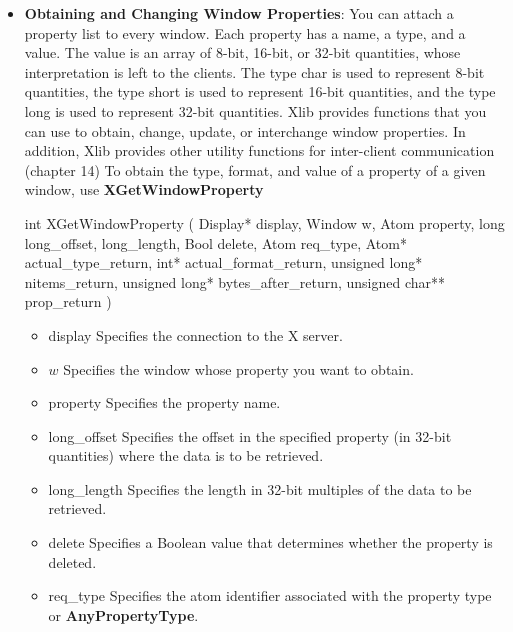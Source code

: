\documentclass{report}
\begin{document}
\begin{itemize}
        \bigbreak \noindent 
        \begin{cppcode}
        typedef unsigned long Atom;
        \end{cppcode}
    \item \textbf{Obtaining and Changing Window Properties}: You can attach a property list to every window. Each property has a name, a type, and a value. The value is an array of 8-bit, 16-bit, or 32-bit quantities, whose interpretation is left to the clients. The type char is used to represent 8-bit quantities, the type short is used to represent 16-bit quantities, and the type long is used to represent 32-bit quantities. 
        \bigbreak \noindent 
        Xlib provides functions that you can use to obtain, change, update, or interchange window properties. In addition, Xlib provides other utility functions for inter-client communication (chapter 14)
        \bigbreak \noindent 
        To obtain the type, format, and value of a property of a given window, use \textbf{XGetWindowProperty}
        \bigbreak \noindent 
        \begin{cppcode}
            int XGetWindowProperty (
                Display* display,
                Window w,
                Atom property,
                long long_offset, long_length,
                Bool delete,
                Atom req_type,
                Atom* actual_type_return,
                int* actual_format_return,
                unsigned long* nitems_return,
                unsigned long* bytes_after_return,
                unsigned char** prop_return
            )
        \end{cppcode}
        \bigbreak \noindent
        \begin{itemize}
            \item display Specifies the connection to the X server.
            \item $w$ Specifies the window whose property you want to obtain.
            \item property Specifies the property name.
            \item long\_offset Specifies the offset in the specified property (in 32-bit quantities) where the data is to be retrieved.
            \item long\_length Specifies the length in 32-bit multiples of the data to be retrieved.
            \item delete Specifies a Boolean value that determines whether the property is deleted.
            \item req\_type Specifies the atom identifier associated with the property type or \textbf{AnyPropertyType}.

\end{itemize}
\end{itemize}
\end{document}
